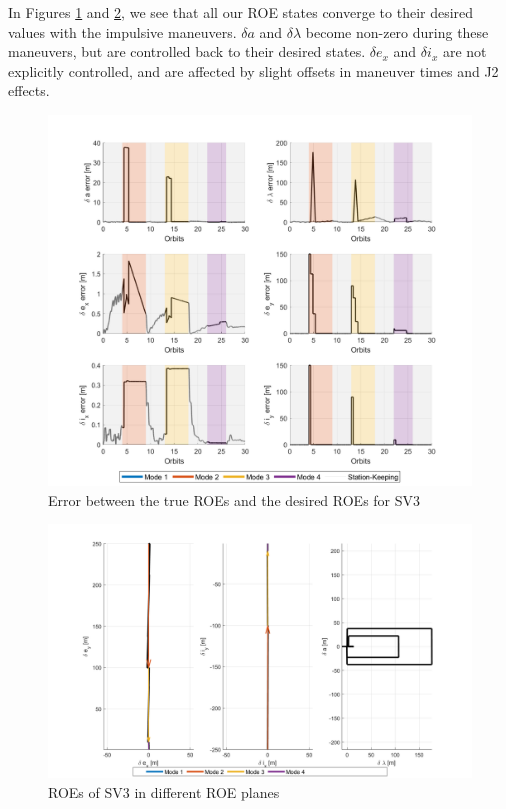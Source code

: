 In Figures \ref{fig:roe_error_control_sv3} and \ref{fig:roe_final_SV3_planes}, we see that all our ROE states converge to their desired values with the impulsive maneuvers. $\delta a$ and $\delta \lambda$ become non-zero during these maneuvers, but are controlled back to their desired states. $\delta e_x$ and $\delta i_x$ are not explicitly controlled, and are affected by slight offsets in maneuver times and J2 effects.
\begin{figure}[H]
    \centering
    \includegraphics[width=0.7\linewidth]{sim/figures/PS9/ROE_error_over_time_modes_SV3.png}
    \caption{Error between the true ROEs and the desired ROEs for SV3}
    \label{fig:roe_error_control_sv3}
\end{figure}

\begin{figure}[H]
    \centering
    \includegraphics[width=0.7\linewidth]{sim/figures/PS9/ROE_planes_modes_SV3.png}
    \caption{ROEs of SV3 in different ROE planes}
    \label{fig:roe_final_SV3_planes}
\end{figure}

